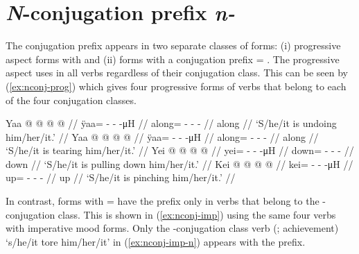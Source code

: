 \clearpage
\section{\textit{N}-conjugation prefix \textit{n-}}\label{sec:nconj}

\begin{multicols}{2}
\noindent
The  conjugation prefix appears in two separate classes of forms:
	(i) progressive aspect forms with 
	and (ii) forms with a conjugation prefix  = .
The progressive aspect uses  in all verbs regardless of their conjugation class.
This can be seen by (\ref{ex:nconj-prog}) which gives four progressive forms of verbs that belong to each of the four conjugation classes.

\pex\label{ex:nconj-prog}%
\a\label{ex:nconj-prog-0}%
%
\begingl
	\gla	Yaa @  @ {} @ {} @ {} //
	\glb	ÿaa= - -  -μH //
	\glc	along= - -  - //
	\gld	along  {} {} {} {} //
	\glft	‘S/he/it is undoing him/her/it.’
		//
\endgl
\a\label{ex:nconj-prog-n}%
%
\begingl
	\gla	Yaa @  @ {} @ {} @ {} //
	\glb	ÿaa= - -  -μH //
	\glc	along= - -  - //
	\gld	along  {} {} {} {} //
	\glft	‘S/he/it is tearing him/her/it.’
		//
\endgl
\a\label{ex:nconj-prog-gh}%
%
\begingl
	\gla	Yei @  @ {} @ {} @ {} //
	\glb	yei= - -  -μH //
	\glc	down= - -  - //
	\gld	down  {} {} {} {} //
	\glft	‘S/he/it is pulling down him/her/it.’
		//
\endgl
\a\label{ex:nconj-prog-g}%
%
\begingl
	\gla	Kei @  @ {} @ {} @ {} //
	\glb	kei= - -  -μH //
	\glc	up= - -  - //
	\gld	up  {} {} {} {} //
	\glft	‘S/he/it is pinching him/her/it.’
		//
\endgl
\xe

In contrast, forms with  =  have the  prefix only in verbs that belong to the -conjugation class.
This is shown in (\ref{ex:nconj-imp}) using the same four verbs with imperative mood forms.
Only the -conjugation class verb  (; achievement) ‘s/he/it tore him/her/it’ in (\ref{ex:nconj-imp-n}) appears with the  prefix.


\end{multicols}

